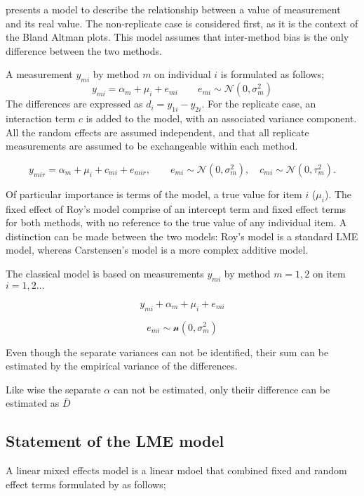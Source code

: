 \documentclass[12pt, a4paper]{report}
\theoremstyle{plain}
\theoremstyle{definition}
\theoremstyle{remark}
\begin{document}
\citet{BXC2004} presents a model to describe the relationship between a value of measurement and its
real value. The non-replicate case is considered first, as it is the context of the Bland Altman plots. This model assumes that inter-method bias is the only difference between the two methods.

A measurement $y_{mi}$ by method $m$ on individual $i$ is formulated as follows;
\begin{equation}
y_{mi}  = \alpha_{m} + \mu_{i} + e_{mi} \qquad  e_{mi} \sim
\mathcal{N}(0,\sigma^{2}_{m})
\end{equation}
The differences are expressed as $d_{i} = y_{1i} - y_{2i}$. For the replicate case, an interaction term $c$ is added to the model, with an associated variance component. All the random effects are assumed independent, and that all replicate measurements are assumed to be exchangeable within each method.

\begin{equation}
y_{mir}  = \alpha_{m} + \mu_{i} + c_{mi} + e_{mir}, \qquad  e_{mi}
\sim \mathcal{N}(0,\sigma^{2}_{m}), \quad c_{mi} \sim \mathcal{N}(0,\tau^{2}_{m}).
\end{equation}

Of particular importance is terms of the model, a true value for item $i$ ($\mu_{i}$).  The fixed effect of Roy's model comprise of an intercept term and fixed effect terms for both methods, with no reference to the true value of any individual item. A distinction can be made between the two models: Roy's model is a standard LME model, whereas Carstensen's model is a more complex additive model.

The classical model is based on measurements $y_{mi}$
by method $m=1,2$ on item $i = 1,2 \ldots$

\[y_{mi} + \alpha_{m} + \mu_{i} + e_{mi}\]

\[e_{mi} \sim \mathcal{n} (0,\sigma^2_m)\]

Even though the separate variances can not be
identified, their sum can be estimated by the empirical variance of the differences.

Like wise the separate $\alpha$ can not be
estimated, only theiir difference can be estimated as
$\bar{D}$


\subsection{Statement of the LME model}

A linear mixed effects model is a linear mdoel that combined fixed and random effect terms formulated by \citet{LW82} as follows;
\end{document}
